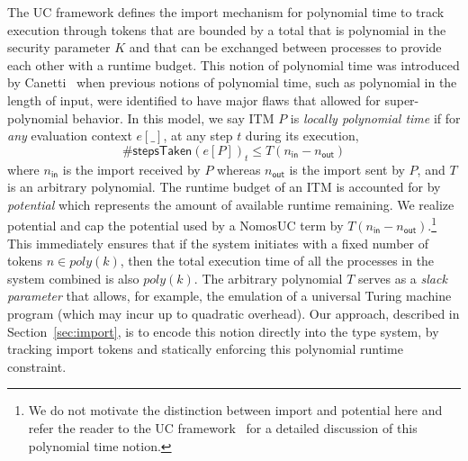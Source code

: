 The UC framework defines the import mechanism for polynomial time to track execution through tokens that
are bounded by a total that is polynomial in the security parameter $K$ and that can be exchanged between processes to provide each other with a runtime budget.
This notion of polynomial time was introduced by Canetti~\cite{canettiUC} when previous notions of polynomial time, such as polynomial in the length of input, were identified to have major flaws that allowed for super-polynomial behavior.
In this model, we say ITM $P$ is \emph{locally polynomial time} if for \emph{any} evaluation context $e[\_]$, at any step $t$ during its execution,
\[
\#\textsf{stepsTaken}(e[P])_{t} \le T(n_{\textsf{in}} - n_{\textsf{out}})
\]
where $n_{\textsf{in}}$ is the import received by $P$ whereas $n_{\textsf{out}}$ is the import sent by $P$, and $T$ is an arbitrary polynomial.
The runtime budget of an ITM is accounted for by \emph{potential} which represents the amount of available runtime remaining.
We realize potential and cap the potential used by a NomosUC term by $T(n_\textsf{in}-n_\textsf{out})$.\footnote{We do not motivate the distinction between import and potential here and refer the reader to the UC framework~\cite{canettiUC} for a detailed discussion of this polynomial time notion.}
This immediately ensures that if the system initiates with a fixed number of tokens $n \in poly(k)$, then the total execution time
of all the processes in the system combined is also $poly(k)$.
The arbitrary polynomial $T$ serves as a \emph{slack parameter} that allows, for example,
the emulation of a universal Turing machine program (which may incur up to quadratic overhead).
Our approach, described in Section~\ref{sec:import}, is to encode this notion directly into the type system, by tracking import tokens and statically enforcing this polynomial runtime constraint.

